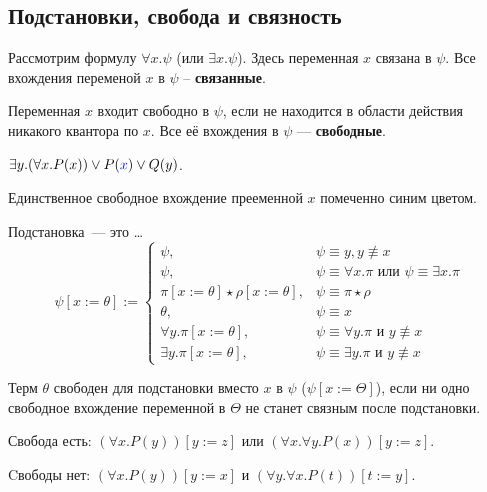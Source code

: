 \subsection{Подстановки, свобода и связность}
\begin{definition}
    Рассмотрим формулу $\forall x.\psi$ (или $\exists x.\psi$). Здесь переменная $x$ связана в $\psi$. Все вхождения переменой $x$ в $\psi$ -- \textbf{связанные}.
\end{definition}
\begin{definition}
    Переменная $x$ входит свободно в $\psi$, если не находится в области действия никакого квантора по $x$.
Все её вхождения в $\psi$ --- \textbf{свободные}.
\end{definition}
\begin{example}
    $\exists y.(\forall x.P(x))\vee P({\color{blue}x}) \vee Q(y)$.

    Единственное свободное вхождение прееменной $x$ помеченно синим цветом.
\end{example}

\begin{definition} Подстановка~--- это \ldots
    \[ \psi[x := \theta] := \left\{\begin{array}{ll}\psi, & \psi\equiv y, y \not\equiv x\\
    \psi, & \psi\equiv\forall x.\pi \textrm{ или } \psi\equiv\exists x.\pi\\
    \pi[x := \theta] \star \rho [x := \theta], & \psi\equiv \pi\star\rho\\
    \theta, & \psi\equiv x\\
    \forall y.\pi[x := \theta], & \psi \equiv \forall y.\pi \textrm{ и } y \not\equiv x\\
    \exists y.\pi[x := \theta], & \psi \equiv \exists y.\pi \textrm{ и } y \not\equiv x
\end{array}\right. \]
\end{definition}


\begin{definition}
    Терм $\theta$ свободен для подстановки вместо $x$ в $\psi$ ($\psi [x:=\Theta]$), если ни одно свободное вхождение переменной в $\Theta$ не станет связным после подстановки.
\end{definition}

Свобода есть: $(\forall x. P(y)) [y:=z]$ или $(\forall x. \forall y. P(x)) [y:=z]$.

Cвободы нет: $(\forall x.P(y))[y:=x]$ и $(\forall y.\forall x.P(t))[t:=y]$.

